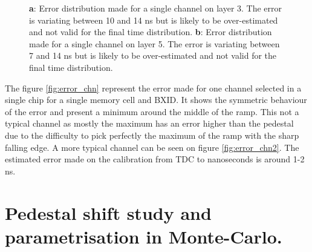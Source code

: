 \documentclass[twoside,a4paper,11pt]{article}
\begin{document}
\begin{appendix}
\begin{figure}[htbp]
	\caption[]{\textbf{a}: Error distribution made for a single channel on layer 3. The error is variating between 10 and 14 ns but is likely to be over-estimated and not valid for the final time distribution. \textbf{b}: Error distribution made for a single channel on layer 5. The error is variating between 7 and 14 ns but is likely to be over-estimated and not valid for the final time distribution.}
	\label{fig:error_calibration}
\end{figure}
The figure \ref{fig:error_chn} represent the error made for one channel selected in a single chip for a single memory cell and BXID. It shows the symmetric behaviour of the error and present a minimum around the middle of the ramp. This not a typical channel as mostly the maximum has an error higher than the pedestal due to the difficulty to pick perfectly the maximum of the ramp with the sharp falling edge. A more typical channel can be seen on figure \ref{fig:error_chn2}.
The estimated error made on the calibration from TDC to nanoseconds is around 1-2 ns.

\newpage
\section{Pedestal shift study and parametrisation in Monte-Carlo.}
\label{appendix:ped_shift}


\end{appendix}
\end{document}
